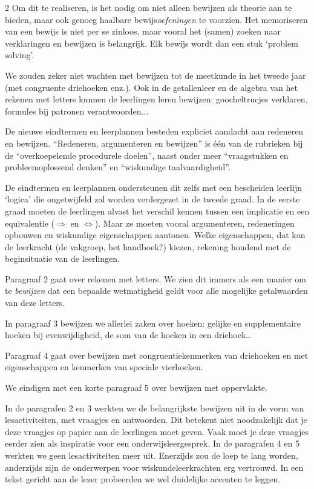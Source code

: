 \begin{multicols}{2}
Om dit te realiseren, is het nodig om niet alleen bewijzen als theorie aan te bieden, maar ook genoeg haalbare bewijs\emph{oefeningen} te voorzien. Het memoriseren van een bewijs is niet per se zinloos, maar vooral het (samen) zoeken naar verklaringen en bewijzen is belangrijk. Elk bewijs wordt dan een stuk `problem solving'. 

We zouden zeker niet wachten met bewijzen tot de meetkunde in het tweede jaar (met congruente driehoeken enz.). Ook in de getallenleer en de algebra van het rekenen met letters kunnen de leerlingen leren bewijzen: goocheltrucjes verklaren, formules bij patronen verantwoorden...

De nieuwe eindtermen en leerplannen besteden expliciet aandacht aan redeneren en bewijzen. ``Redeneren, argumenteren en bewijzen'' is één van de rubrieken bij de ``overkoepelende procedurele doelen'', naast onder meer ``vraagstukken en probleemoplossend denken'' en ``wiskundige taalvaardigheid''. 

De eindtermen en leerplannen ondersteunen dit zelfs met een bescheiden leerlijn `logica' die ongetwijfeld zal worden verdergezet in de tweede graad. In de eerste graad moeten de leerlingen alvast het verschil kennen tussen een implicatie en een equivalentie ($\Rightarrow$ en $\Leftrightarrow$). Maar ze moeten vooral argumenteren, redeneringen opbouwen en wiskundige eigenschappen aantonen. Welke eigenschappen, dat kan de leerkracht (de vakgroep, het handboek?) kiezen, rekening houdend met de beginsituatie van de leerlingen.

Paragraaf 2 gaat over rekenen met letters. We zien dit immers als een manier om te \emph{bewijzen} dat een bepaalde wetmatigheid geldt voor alle mogelijke getalwaarden van deze letters.

In paragraaf 3 bewijzen we allerlei zaken over hoeken: gelijke en supplementaire hoeken bij evenwijdigheid, de som van de hoeken in een driehoek… 

Paragraaf 4 gaat over bewijzen met congruentiekenmerken van driehoeken en met eigenschappen en kenmerken van speciale vierhoeken. 

We eindigen met een korte paragraaf 5 over bewijzen met oppervlakte.

In de paragrafen 2 en 3 werkten we de belangrijkste bewijzen uit in de vorm van lesactiviteiten, met vraagjes en antwoorden. Dit betekent niet noodzakelijk dat je deze vraagjes op papier aan de leerlingen moet geven. Vaak moet je deze vraagjes eerder zien als inspiratie voor een onderwijsleergesprek. In de paragrafen 4 en 5 werkten we geen lesactiviteiten meer uit. Enerzijds zou de loep te lang worden, anderzijds zijn de onderwerpen voor wiskundeleerkrachten erg vertrouwd. In een tekst gericht aan de lezer probeerden we wel duidelijke accenten te leggen.


\end{multicols}
